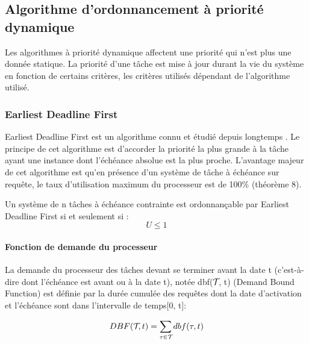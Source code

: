 \subsection{Algorithme d’ordonnancement à priorité dynamique}
Les algorithmes à priorité dynamique affectent une priorité qui n'est
plus une donnée statique.  La priorité d'une tâche est mise à jour
durant la vie du système en fonction de certains critères, les
critères utilisés dépendant de l'algorithme utilisé.

\subsubsection{Earliest Deadline First\cite{LL73}}
Earliest Deadline First est un algorithme connu et étudié depuis
longtemps \cite{LL73, Der74, Hor74}. Le principe de cet algorithme est
d'accorder la priorité la plus grande à la tâche ayant une instance
dont l'échéance absolue est la plus proche.  L'avantage majeur de cet
algorithme est qu'en présence d'un système de tâche à échéance sur
requête, le taux d'utilisation maximum du processeur est de 100\%
(théorème 8).

\begin{theoreme}[\cite{LL73}]
 Un système de n tâches à échéance contrainte est ordonnançable par
 Earliest Deadline First si et seulement si :
 \begin{equation}
 U \leq 1
 \end{equation}
\end{theoreme}

\paragraph{Fonction de demande du processeur}

La demande du processeur des tâches devant se terminer avant la date t
(c’est-à-dire dont l’échéance est avant ou à la date t), notée
dbf($\mathcal{T}_{}$, t) (Demand Bound Function) est définie par la durée
cumulée des requêtes dont la date d’activation et l’échéance sont dans
l’intervalle de temps[0, t]:

\begin{equation}
DBF(\mathcal{T}_{},t) = \sum_{\tau_{} \in \mathcal{T}_{}}dbf(\tau_{},t)
\end{equation}
%

